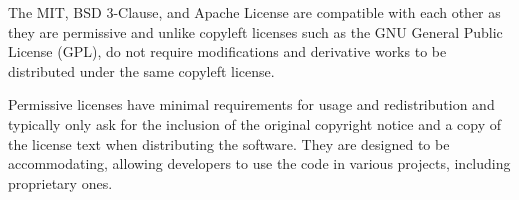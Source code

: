 The MIT, BSD 3-Clause, and Apache License are compatible with each other as they are permissive and unlike copyleft licenses such as the GNU General Public License (GPL), do not require modifications and derivative works to be distributed under the same copyleft license.

Permissive licenses have minimal requirements for usage and redistribution and typically only ask for the inclusion of the original copyright notice and a copy of the license text when distributing the software. They  are designed to be accommodating, allowing developers to use the code in various projects, including proprietary ones.




